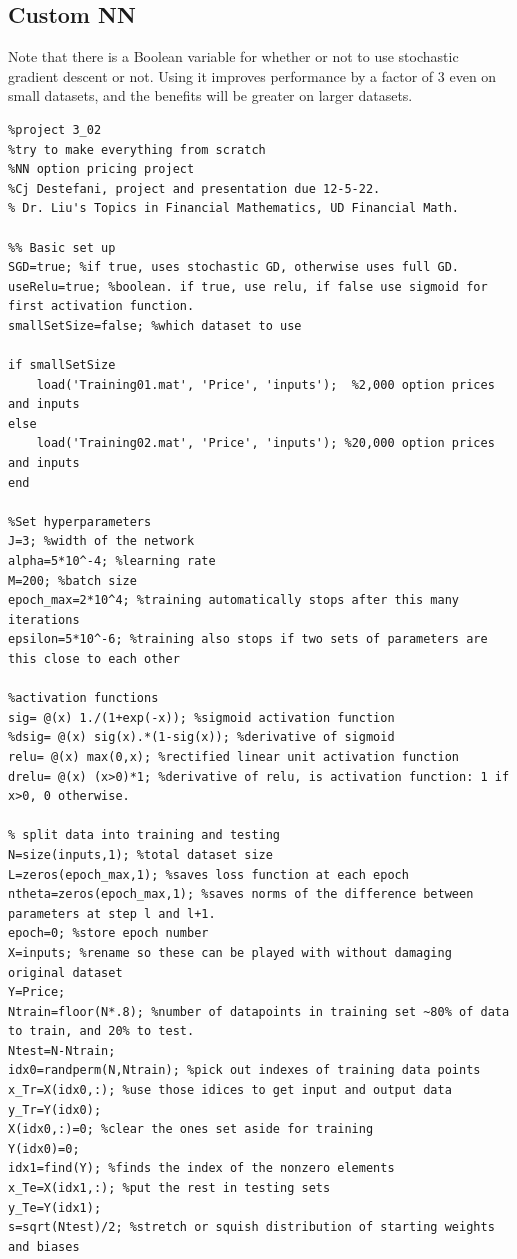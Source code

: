 \documentclass[reqno,14pt]{amsart}
\theoremstyle{plain}
\theoremstyle{definition}
\theoremstyle{remark}
\begin{document}
\subsection{Custom NN} Note that there is a Boolean variable for whether or not to use stochastic gradient descent or not. Using it improves performance by a factor of 3 even on small datasets, and the benefits will be greater on larger datasets.\\

\begin{lstlisting}
%project 3_02
%try to make everything from scratch
%NN option pricing project
%Cj Destefani, project and presentation due 12-5-22.
% Dr. Liu's Topics in Financial Mathematics, UD Financial Math.

%% Basic set up
SGD=true; %if true, uses stochastic GD, otherwise uses full GD.
useRelu=true; %boolean. if true, use relu, if false use sigmoid for first activation function.
smallSetSize=false; %which dataset to use

if smallSetSize
    load('Training01.mat', 'Price', 'inputs');  %2,000 option prices and inputs
else
    load('Training02.mat', 'Price', 'inputs'); %20,000 option prices and inputs
end

%Set hyperparameters
J=3; %width of the network
alpha=5*10^-4; %learning rate
M=200; %batch size
epoch_max=2*10^4; %training automatically stops after this many iterations
epsilon=5*10^-6; %training also stops if two sets of parameters are this close to each other

%activation functions
sig= @(x) 1./(1+exp(-x)); %sigmoid activation function
%dsig= @(x) sig(x).*(1-sig(x)); %derivative of sigmoid
relu= @(x) max(0,x); %rectified linear unit activation function
drelu= @(x) (x>0)*1; %derivative of relu, is activation function: 1 if x>0, 0 otherwise.

% split data into training and testing
N=size(inputs,1); %total dataset size
L=zeros(epoch_max,1); %saves loss function at each epoch
ntheta=zeros(epoch_max,1); %saves norms of the difference between parameters at step l and l+1. 
epoch=0; %store epoch number
X=inputs; %rename so these can be played with without damaging original dataset
Y=Price;
Ntrain=floor(N*.8); %number of datapoints in training set ~80% of data to train, and 20% to test.
Ntest=N-Ntrain;
idx0=randperm(N,Ntrain); %pick out indexes of training data points
x_Tr=X(idx0,:); %use those idices to get input and output data
y_Tr=Y(idx0);
X(idx0,:)=0; %clear the ones set aside for training
Y(idx0)=0;
idx1=find(Y); %finds the index of the nonzero elements
x_Te=X(idx1,:); %put the rest in testing sets
y_Te=Y(idx1);
s=sqrt(Ntest)/2; %stretch or squish distribution of starting weights and biases


\end{lstlisting}
\end{document}

